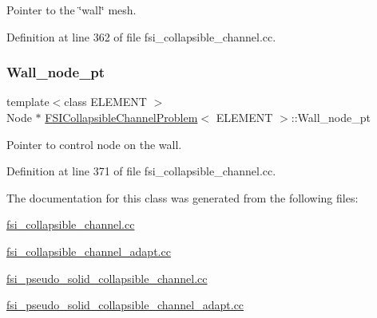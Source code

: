 Pointer to the \char`\"{}wall\char`\"{} mesh. 



Definition at line 362 of file fsi\+\_\+collapsible\+\_\+channel.\+cc.

\mbox{\label{classFSICollapsibleChannelProblem_ad840e3bf0ee356ac054d9bcab97471d9}} 
\subsubsection{\texorpdfstring{Wall\+\_\+node\+\_\+pt}{Wall\_node\_pt}}
{\footnotesize\ttfamily template$<$class E\+L\+E\+M\+E\+NT $>$ \\
Node $\ast$ \hyperlink{classFSICollapsibleChannelProblem}{F\+S\+I\+Collapsible\+Channel\+Problem}$<$ E\+L\+E\+M\+E\+NT $>$\+::Wall\+\_\+node\+\_\+pt\hspace{0.3cm}{\ttfamily [private]}}



Pointer to control node on the wall. 



Definition at line 371 of file fsi\+\_\+collapsible\+\_\+channel.\+cc.



The documentation for this class was generated from the following files\+:\begin{DoxyCompactItemize}
\item 
\hyperlink{fsi__collapsible__channel_8cc}{fsi\+\_\+collapsible\+\_\+channel.\+cc}\item 
\hyperlink{fsi__collapsible__channel__adapt_8cc}{fsi\+\_\+collapsible\+\_\+channel\+\_\+adapt.\+cc}\item 
\hyperlink{fsi__pseudo__solid__collapsible__channel_8cc}{fsi\+\_\+pseudo\+\_\+solid\+\_\+collapsible\+\_\+channel.\+cc}\item 
\hyperlink{fsi__pseudo__solid__collapsible__channel__adapt_8cc}{fsi\+\_\+pseudo\+\_\+solid\+\_\+collapsible\+\_\+channel\+\_\+adapt.\+cc}\end{DoxyCompactItemize}
